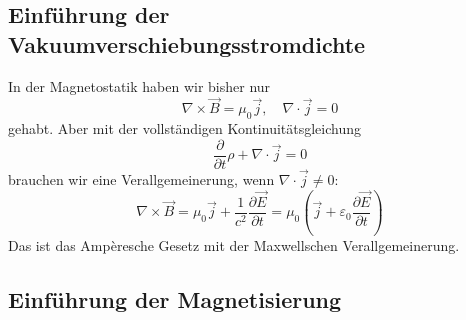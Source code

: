 \subsection{Einführung der Vakuumverschiebungsstromdichte}

In der Magnetostatik haben wir bisher nur
\begin{equation*}
	\nabla \times \vec {B}=\mu _{0}\vec {j},\quad\nabla \cdot \vec {j}=0
\end{equation*}
gehabt. Aber mit der vollständigen Kontinuitätsgleichung
\begin{equation*}
	\frac{\partial }{\partial t}\rho +\nabla \cdot \vec {j}=0
\end{equation*}
brauchen wir eine Verallgemeinerung, wenn $\nabla \cdot \vec {j}\neq 0$:
\begin{equation*}
	\nabla \times \vec {B}=\mu _{0}\vec {j}+\frac{1}{c^{2}}\frac{\partial \vec {E}}{\partial t}=\mu _{0}\left(\vec {j}+\varepsilon _{0}\frac{\partial \vec {E}}{\partial t}\right)
\end{equation*}
Das ist das Ampèresche Gesetz mit der Maxwellschen Verallgemeinerung.

\subsection{Einführung der Magnetisierung}

